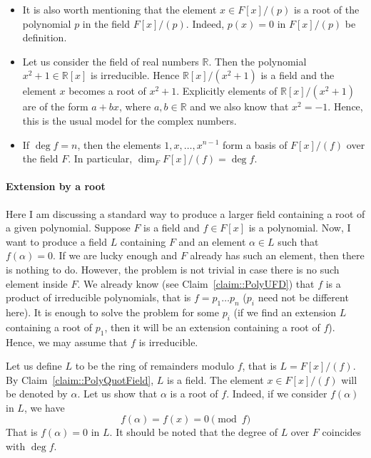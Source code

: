 \begin{remarks}
\begin{itemize}
\item It is also worth mentioning that the element $x\in F[x]/(p)$ is a root of the polynomial $p$ in the field $F[x]/(p)$.
Indeed, $p(x) = 0$ in $F[x]/(p)$ be definition.

\item Let us consider the field of real numbers $\mathbb R$.
Then the polynomial $x^2 + 1\in \mathbb R[x]$ is irreducible.
Hence $\mathbb R[x]/(x^2 +1)$ is a field and the element $x$ becomes a root of $x^2 + 1$.
Explicitly elements of $\mathbb R[x]/(x^2 + 1)$ are of the form $a + bx$, where $a, b\in \mathbb R$ and we also know that $x^2 = -1$.
Hence, this is the usual model for the complex numbers.

\item If $\deg f = n$, then the elements $1, x, \ldots, x^{n-1}$ form a basis of $F[x]/(f)$ over the field $F$.
In particular, $\dim_F F[x]/(f) = \deg f$.
\end{itemize}
\end{remarks}


\paragraph{Extension by a root}

Here I am discussing a standard way to produce a larger field containing a root of a given polynomial.
Suppose $F$ is a field and $f\in F[x]$ is a polynomial.
Now, I want to produce a field $L$ containing $F$ and an element $\alpha \in L$ such that $f(\alpha) = 0$.
If we are lucky enough and $F$ already has such an element, then there is nothing to do.
However, the problem is not trivial in case there is no such element inside $F$.
We already know (see Claim~\ref{claim::PolyUFD}) that $f$ is a product of irreducible polynomials, that is $f = p_1\ldots p_n$ ($p_i$ need not be different here).
It is enough to solve the problem for some $p_i$ (if we find an extension $L$ containing a root of $p_1$, then it will be an extension containing a root of $f$).
Hence, we may assume that $f$ is irreducible.

Let us define $L$ to be the ring of remainders modulo $f$, that is $L = F[x]/(f)$.
By Claim~\ref{claim::PolyQuotField}, $L$ is a field.
The element $x\in F[x]/(f)$ will be denoted by $\alpha$.
Let us show that $\alpha$ is a root of $f$.
Indeed, if we consider $f(\alpha)$ in $L$, we have
\[
f(\alpha) = f(x) = 0 \pmod f
\]
That is $f(\alpha) = 0$ in $L$.
It should be noted that the degree of $L$ over $F$ coincides with $\deg f$.


